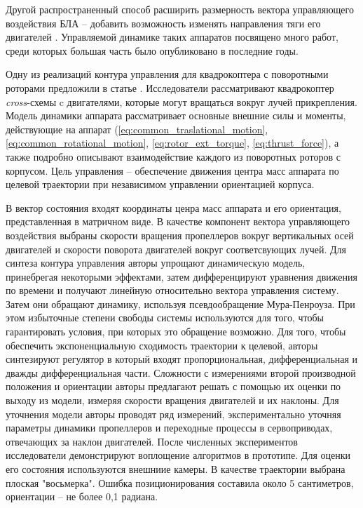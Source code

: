 Другой распространенный способ расширить размерность вектора управляющего воздействия БЛА -- добавить возможность изменять направления тяги его двигателей \cite{Papachristos01, Gupta01, Lin01, Dharmawan01}. Управляемой динамике таких аппаратов посвящено много работ, среди которых большая часть было опубликовано в последние годы.

Одну из реализаций контура управления для квадрокоптера с поворотными роторами предложили в статье \cite{Ryll01}. Исследователи рассматривают квадрокоптер \textit{cross}-схемы c двигателями, которые могут вращаться вокруг лучей прикрепления. Модель динамики аппарата рассматривает основные внешние силы и моменты, действующие на аппарат (\ref{eq:common_traslational_motion}, \ref{eq:common_rotational_motion}, \ref{eq:rotor_ext_torque}, \ref{eq:thrust_force}), а также подробно описывают взаимодействие каждого из поворотных роторов с корпусом. Цель управления -- обеспечение движения центра масс аппарата по целевой траектории при независимом управлении ориентацией корпуса. 


В вектор состояния входят координаты ценра масс аппарата и его ориентация, представленная в матричном виде. В качестве компонент вектора управляющего воздействия выбраны скорости вращения пропеллеров вокруг вертикальных осей двигателей и скорости поворота двигателей вокруг соответсвующих лучей. Для синтеза контура управления авторы упрощают динамическую модель, принебрегая некоторыми эффектами, затем дифференцируют уравнения движения по времени и получают линейную относительно вектора управления систему. Затем они обращают динамику, используя псевдообращение Мура-Пенроуза. При этом избыточные степени свободы системы используются для того, чтобы гарантировать условия, при которых это обращение возможно. Для того, чтобы обеспечить экспоненциальную сходимость траектории к целевой, авторы синтезируют регулятор в который входят пропорциональная, дифференциальная и дважды дифференциальная части. Сложности с измерениями второй производной положения и ориентации авторы предлагают решать с помощью их оценки по выходу из модели, измеряя скорости вращения двигателей и их наклоны. Для уточнения модели авторы проводят ряд измерений, экспериментально уточняя параметры динамики пропеллеров и переходные процессы в сервоприводах, отвечающих за наклон двигателей. После численных экспериментов исследователи демонстрируют воплощение алгоритмов в прототипе. Для оценки его состояния используются внешниие камеры. В качестве траектории выбрана плоская "восьмерка". Ошибка позиционирования составила около 5 сантиметров, ориентации -- не более 0,1 радиана.

